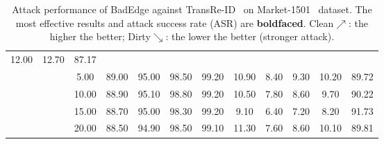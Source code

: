 \begin{table}[htbp]
{\begin{tabular}{cc|c|ccccccccc}
  \multicolumn{1}{c|}{12.00} &
  \multicolumn{1}{c|}{12.70} &
  87.17 \\ \cline{3-12} 
\multicolumn{1}{c|}{} &
   &
  5.00 &
  \multicolumn{1}{c|}{89.00} &
  \multicolumn{1}{c|}{95.00} &
  \multicolumn{1}{c|}{98.50} &
  \multicolumn{1}{c|}{99.20} &
  \multicolumn{1}{c|}{10.90} &
  \multicolumn{1}{c|}{8.40} &
  \multicolumn{1}{c|}{9.30} &
  \multicolumn{1}{c|}{10.20} &
  89.72 \\ \cline{3-12} 
\multicolumn{1}{c|}{} &
   &
  10.00 &
  \multicolumn{1}{c|}{88.90} &
  \multicolumn{1}{c|}{95.10} &
  \multicolumn{1}{c|}{98.80} &
  \multicolumn{1}{c|}{99.20} &
  \multicolumn{1}{c|}{10.50} &
  \multicolumn{1}{c|}{7.80} &
  \multicolumn{1}{c|}{8.60} &
  \multicolumn{1}{c|}{9.70} &
  90.22 \\ \cline{3-12} 
\multicolumn{1}{c|}{} &
   &
  15.00 &
  \multicolumn{1}{c|}{88.70} &
  \multicolumn{1}{c|}{95.00} &
  \multicolumn{1}{c|}{98.30} &
  \multicolumn{1}{c|}{99.20} &
  \multicolumn{1}{c|}{9.10} &
  \multicolumn{1}{c|}{6.40} &
  \multicolumn{1}{c|}{7.20} &
  \multicolumn{1}{c|}{8.20} &
  91.73 \\ \cline{3-12} 
\multicolumn{1}{c|}{} &
   &
  20.00 &
  \multicolumn{1}{c|}{88.50} &
  \multicolumn{1}{c|}{94.90} &
  \multicolumn{1}{c|}{98.50} &
  \multicolumn{1}{c|}{99.10} &
  \multicolumn{1}{c|}{11.30} &
  \multicolumn{1}{c|}{7.60} &
  \multicolumn{1}{c|}{8.60} &
  \multicolumn{1}{c|}{10.10} &
  89.81 \\ \hline
\end{tabular}
}
\caption{
Attack performance of BadEdge against TransRe-ID~\cite{sun2018beyond} on Market-1501~\cite{zhang2017alignedreid} dataset. The most effective results and attack success rate (ASR) are \textbf{boldfaced}. Clean$\nearrow$: the higher the better; Dirty$\searrow$: the lower the better (stronger attack).}
% 
\label{tab:TransRe-ID}
\vspace{-0.6cm}
\end{table}